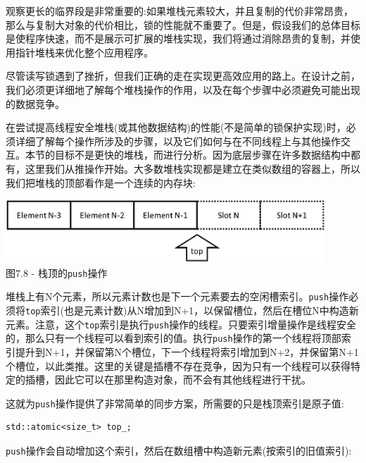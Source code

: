 观察更长的临界段是非常重要的:如果堆栈元素较大，并且复制的代价非常昂贵，那么与复制大对象的代价相比，锁的性能就不重要了。但是，假设我们的总体目标是使程序快速，而不是展示可扩展的堆栈实现，我们将通过消除昂贵的复制，并使用指针堆栈来优化整个应用程序。

尽管读写锁遇到了挫折，但我们正确的走在实现更高效应用的路上。在设计之前，我们必须更详细地了解每个堆栈操作的作用，以及在每个步骤中必须避免可能出现的数据竞争。


在尝试提高线程安全堆栈(或其他数据结构)的性能(不是简单的锁保护实现)时，必须详细了解每个操作所涉及的步骤，以及它们如何与在不同线程上与其他操作交互。本节的目标不是更快的堆栈，而进行分析。因为底层步骤在许多数据结构中都有，这里我们从推操作开始。大多数堆栈实现都是建立在类似数组的容器上，所以我们把堆栈的顶部看作是一个连续的内存块:

\begin{center}
\includegraphics[width=0.9\textwidth]{content/2/chapter7/images/8.jpg}\\
图7.8 - 栈顶的\texttt{push}操作
\end{center}

堆栈上有N个元素，所以元素计数也是下一个元素要去的空闲槽索引。\texttt{push}操作必须将\texttt{top}索引(也是元素计数)从N增加到N+1，以保留槽位，然后在槽位N中构造新元素。注意，这个\texttt{top}索引是执行\texttt{push}操作的线程。只要索引增量操作是线程安全的，那么只有一个线程可以看到索引的值。执行\texttt{push}操作的第一个线程将顶部索引提升到N+1，并保留第N个槽位，下一个线程将索引增加到N+2，并保留第N+1个槽位，以此类推。这里的关键是插槽不存在竞争，因为只有一个线程可以获得特定的插槽，因此它可以在那里构造对象，而不会有其他线程进行干扰。

这就为\texttt{push}操作提供了非常简单的同步方案，所需要的只是栈顶索引是原子值:

\begin{lstlisting}[style=styleCXX]
std::atomic<size_t> top_;
\end{lstlisting}

\texttt{push}操作会自动增加这个索引，然后在数组槽中构造新元素(按索引的旧值索引):

